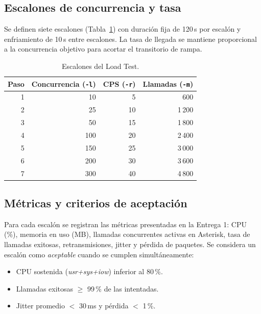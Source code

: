 \documentclass[conference]{IEEEtran}
\begin{document}
\subsection{Escalones de concurrencia y tasa}

Se definen siete escalones (Tabla~\ref{tab:escalones}) con duraci\'on
fija de 120\,s por escal\'on y enfriamiento de 10\,s entre escalones.
La tasa de llegada se mantiene proporcional a la concurrencia objetivo
para acortar el transitorio de rampa.

\begin{table}[!h]
\caption{Escalones del Load Test.}
\label{tab:escalones}
\renewcommand{\arraystretch}{1.2}
\setlength{\tabcolsep}{6pt}
\begin{center}
\footnotesize
\begin{tabular}{@{}rrrr@{}}
\toprule
\textbf{Paso} & \textbf{Concurrencia (\texttt{-l})} & \textbf{CPS (\texttt{-r})} & \textbf{Llamadas (\texttt{-m})} \\
\midrule
1 & 10  & 5  & 600   \\
2 & 25  & 10 & 1\,200 \\
3 & 50  & 15 & 1\,800 \\
4 & 100 & 20 & 2\,400 \\
5 & 150 & 25 & 3\,000 \\
6 & 200 & 30 & 3\,600 \\
7 & 300 & 40 & 4\,800 \\
\bottomrule
\end{tabular}
\end{center}
\end{table}

\subsection{M\'etricas y criterios de aceptaci\'on}

Para cada escal\'on se registran las m\'etricas presentadas en la
Entrega 1: CPU (\%), memoria en uso (MB), llamadas concurrentes
activas en Asterisk, tasa de llamadas exitosas, retransmisiones,
jitter y p\'erdida de paquetes. Se considera un escal\'on como
\textit{aceptable} cuando se cumplen simult\'aneamente:

\begin{itemize}
    \item CPU sostenida (\textit{usr+sys+iow}) inferior al 80\,\%.
    \item Llamadas exitosas $\geq$ 99\,\% de las intentadas.
    \item Jitter promedio $<$ 30\,ms y p\'erdida $<$ 1\,\%.
\end{itemize}
\end{document}

